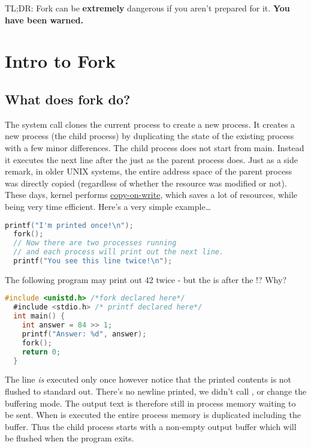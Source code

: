 TL;DR: Fork can be \textbf{extremely} dangerous if you aren't prepared for it. \textbf{You have been warned.}

\section{Intro to Fork}

\subsection{What does fork do?}

The  system call clones the current process to create a new process. It creates a new process (the child process) by duplicating the state of the existing process with a few minor differences. The child process does not start from main. Instead it executes the next line after the  just as the parent process does. Just as a side remark, in older UNIX systems, the entire address space of the parent process was directly copied (regardless of whether the resource was modified or not). These days, kernel performs \href{https://en.wikipedia.org/wiki/Copy-on-write}{copy-on-write}, which saves a lot of resources, while being very time efficient. Here's a very simple example\ldots{}

\begin{lstlisting}[language=C]
  printf("I'm printed once!\n");
  fork();
  // Now there are two processes running
  // and each process will print out the next line.
  printf("You see this line twice!\n");
\end{lstlisting}

The following program may print out 42 twice - but the  is after the !? Why?

\begin{lstlisting}[language=C]
  #include <unistd.h> /*fork declared here*/
  #include <stdio.h> /* printf declared here*/
  int main() {
    int answer = 84 >> 1;
    printf("Answer: %d", answer);
    fork();
    return 0;
  }
\end{lstlisting}

The  line \emph{is} executed only once however notice that the printed contents is not flushed to standard out. There's no newline printed, we didn't call , or change the buffering mode. The output text is therefore still in process memory waiting to be sent. When  is executed the entire process memory is duplicated including the buffer. Thus the child process starts with a non-empty output buffer which will be flushed when the program exits.

